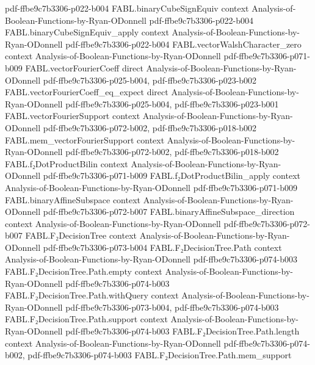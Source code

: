 \begin{theorem}
  {pdf-ffbe9c7b3306-p022-b004}
\proofstep
  {FABL.binaryCubeSignEquiv}
  {context}
  {Analysis-of-Boolean-Functions-by-Ryan-ODonnell}
  {pdf-ffbe9c7b3306-p022-b004}
\proofstep
  {FABL.binaryCubeSignEquiv_apply}
  {context}
  {Analysis-of-Boolean-Functions-by-Ryan-ODonnell}
  {pdf-ffbe9c7b3306-p022-b004}
\proofstep
  {FABL.vectorWalshCharacter_zero}
  {context}
  {Analysis-of-Boolean-Functions-by-Ryan-ODonnell}
  {pdf-ffbe9c7b3306-p071-b009}
\proofstep
  {FABL.vectorFourierCoeff}
  {direct}
  {Analysis-of-Boolean-Functions-by-Ryan-ODonnell}
  {pdf-ffbe9c7b3306-p025-b004,
    pdf-ffbe9c7b3306-p023-b002}
\proofstep
  {FABL.vectorFourierCoeff_eq_expect}
  {direct}
  {Analysis-of-Boolean-Functions-by-Ryan-ODonnell}
  {pdf-ffbe9c7b3306-p025-b004,
    pdf-ffbe9c7b3306-p023-b001}
\proofstep
  {FABL.vectorFourierSupport}
  {context}
  {Analysis-of-Boolean-Functions-by-Ryan-ODonnell}
  {pdf-ffbe9c7b3306-p072-b002,
    pdf-ffbe9c7b3306-p018-b002}
\proofstep
  {FABL.mem_vectorFourierSupport}
  {context}
  {Analysis-of-Boolean-Functions-by-Ryan-ODonnell}
  {pdf-ffbe9c7b3306-p072-b002,
    pdf-ffbe9c7b3306-p018-b002}
\proofstep
  {FABL.f₂DotProductBilin}
  {context}
  {Analysis-of-Boolean-Functions-by-Ryan-ODonnell}
  {pdf-ffbe9c7b3306-p071-b009}
\proofstep
  {FABL.f₂DotProductBilin_apply}
  {context}
  {Analysis-of-Boolean-Functions-by-Ryan-ODonnell}
  {pdf-ffbe9c7b3306-p071-b009}
\proofstep
  {FABL.binaryAffineSubspace}
  {context}
  {Analysis-of-Boolean-Functions-by-Ryan-ODonnell}
  {pdf-ffbe9c7b3306-p072-b007}
\proofstep
  {FABL.binaryAffineSubspace_direction}
  {context}
  {Analysis-of-Boolean-Functions-by-Ryan-ODonnell}
  {pdf-ffbe9c7b3306-p072-b007}
\proofstep
  {FABL.F₂DecisionTree}
  {context}
  {Analysis-of-Boolean-Functions-by-Ryan-ODonnell}
  {pdf-ffbe9c7b3306-p073-b004}
\proofstep
  {FABL.F₂DecisionTree.Path}
  {context}
  {Analysis-of-Boolean-Functions-by-Ryan-ODonnell}
  {pdf-ffbe9c7b3306-p074-b003}
\proofstep
  {FABL.F₂DecisionTree.Path.empty}
  {context}
  {Analysis-of-Boolean-Functions-by-Ryan-ODonnell}
  {pdf-ffbe9c7b3306-p074-b003}
\proofstep
  {FABL.F₂DecisionTree.Path.withQuery}
  {context}
  {Analysis-of-Boolean-Functions-by-Ryan-ODonnell}
  {pdf-ffbe9c7b3306-p073-b004,
    pdf-ffbe9c7b3306-p074-b003}
\proofstep
  {FABL.F₂DecisionTree.Path.support}
  {context}
  {Analysis-of-Boolean-Functions-by-Ryan-ODonnell}
  {pdf-ffbe9c7b3306-p074-b003}
\proofstep
  {FABL.F₂DecisionTree.Path.length}
  {context}
  {Analysis-of-Boolean-Functions-by-Ryan-ODonnell}
  {pdf-ffbe9c7b3306-p074-b002,
    pdf-ffbe9c7b3306-p074-b003}
\proofstep
  {FABL.F₂DecisionTree.Path.mem_support}

\end{theorem}
